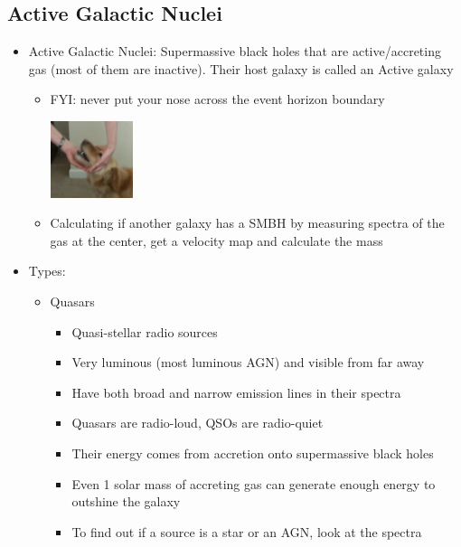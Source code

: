 \documentclass{book}
\begin{document}
\subsection{Active Galactic Nuclei}
\begin{itemize}
    \item Active Galactic Nuclei: Supermassive black holes that are active/accreting gas (most of them are inactive). Their host galaxy is called an Active galaxy
          \begin{itemize}
              \item FYI: never put your nose across the event horizon boundary
                    \begin{center}
                        \includegraphics[width = 0.2\textwidth]{images/agn_dog.png}
                    \end{center}
              \item Calculating if another galaxy has a SMBH by measuring spectra of the gas at the center, get a velocity map and calculate the mass
          \end{itemize}
    \item Types:
          \begin{itemize}
              \item Quasars
                    \begin{itemize}
                        \item Quasi-stellar radio sources
                        \item Very luminous (most luminous AGN) and visible from far away
                        \item Have both broad and narrow emission lines in their spectra
                        \item Quasars are radio-loud, QSOs are radio-quiet
                        \item Their energy comes from accretion onto supermassive black holes
                        \item Even 1 solar mass of accreting gas can generate enough energy to outshine the galaxy
                        \item To find out if a source is a star or an AGN, look at the spectra
                    \end{itemize}

\end{itemize}
\end{itemize}
\end{document}
